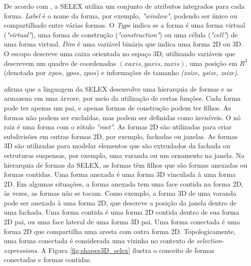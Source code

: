 De acordo com , a \gls{SELEX} utiliza um conjunto de atributos integrados para cada forma. \textit{Label} é o nome da forma, por exemplo, \textit{"window"}, podendo ser único ou compartilhado entre várias formas. O \textit{Type} indica se a forma é uma forma virtual (\textit{"virtual"}), uma forma de construção (\textit{"construction"}) ou uma célula (\textit{"cell"}) de uma forma virtual. \textit{Dim} é uma variável binária que indica uma forma 2D ou 3D. O escopo descreve uma caixa orientada no espaço 3D, utilizando variáveis que descrevem um quadro de coordenadas $(xaxis, yaxis, zaxis)$, uma posição em $R^3$ (denotada por $xpos$, $ypos$, $zpos$) e informações de tamanho \textit{(xsize, ysize, zsize)}.

 afirma que a linguagem da \gls{SELEX} desenvolve uma hierarquia de formas e as armazena em uma árvore, por meio da utilização de certas funções. Cada forma pode ter apenas um pai, e apenas formas de construção podem ter filhos. As formas não podem ser excluídas, mas podem ser definidas como invisíveis. O nó raiz é uma forma com o rótulo \textit{"root"}. As formas 2D são utilizadas para criar subdivisões em outras formas 2D, por exemplo, fachadas ou janelas. As formas 3D são utilizadas para modelar elementos que são extrudados da fachada ou estruturas suspensas, por exemplo, uma varanda ou um ornamento na janela. Na hierarquia de formas da \gls{SELEX}, as formas têm filhos que são formas anexadas ou formas contidas. Uma forma anexada é uma forma 3D vinculada à uma forma 2D. Em algumas situações, a forma anexada tem uma face contida na forma 2D, às vezes, as formas não se tocam. Como exemplo, a forma 3D de uma varanda pode ser anexada à uma forma 2D, que descreve a posição da janela dentro de uma fachada. Uma forma contida é uma forma 2D contida dentro de sua forma 2D pai, ou uma face lateral de uma forma 3D pai. Uma forma conectada é uma forma 2D que compartilha uma aresta com outra forma 2D. Topologicamente, uma forma conectada é considerada uma vizinha no contexto de \textit{selection-expressions}. A Figura \ref{fig:shapes3D_selex} ilustra o conceito de formas conectadas e formas contidas.

\begin{figure}[h!]
	\centering
	\captionsetup{width=15cm}
	{}	
\end{figure}

